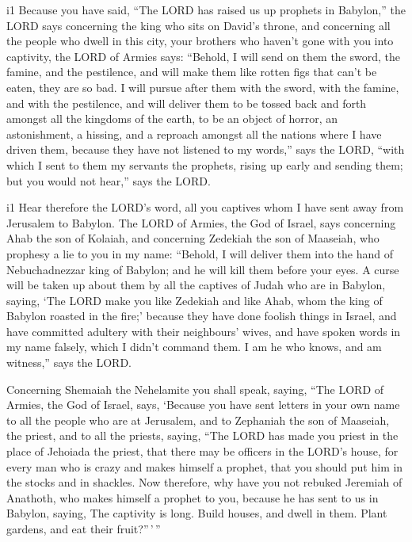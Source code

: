 i1 Because you have said, ``The LORD has raised us up
prophets in Babylon,''  the LORD says concerning the king
who sits on David's throne, and concerning all the people who dwell in
this city, your brothers who haven't gone with you into captivity,
 the LORD of Armies says: ``Behold, I will send on them
the sword, the famine, and the pestilence, and will make them like
rotten figs that can't be eaten, they are so bad.  I will
pursue after them with the sword, with the famine, and with the
pestilence, and will deliver them to be tossed back and forth amongst
all the kingdoms of the earth, to be an object of horror, an
astonishment, a hissing, and a reproach amongst all the nations where I
have driven them,  because they have not listened to my
words,'' says the LORD, ``with which I sent to them my servants the
prophets, rising up early and sending them; but you would not hear,''
says the LORD.

i1 Hear therefore the LORD's word, all you captives whom
I have sent away from Jerusalem to Babylon.  The LORD of
Armies, the God of Israel, says concerning Ahab the son of Kolaiah, and
concerning Zedekiah the son of Maaseiah, who prophesy a lie to you in my
name: ``Behold, I will deliver them into the hand of Nebuchadnezzar king
of Babylon; and he will kill them before your eyes.  A
curse will be taken up about them by all the captives of Judah who are
in Babylon, saying, `The LORD make you like Zedekiah and like Ahab, whom
the king of Babylon roasted in the fire;'  because they
have done foolish things in Israel, and have committed adultery with
their neighbours' wives, and have spoken words in my name falsely, which
I didn't command them. I am he who knows, and am witness,'' says the
LORD.

 Concerning Shemaiah the Nehelamite you shall speak,
saying,  ``The LORD of Armies, the God of Israel, says,
`Because you have sent letters in your own name to all the people who
are at Jerusalem, and to Zephaniah the son of Maaseiah, the priest, and
to all the priests, saying,  ``The LORD has made you
priest in the place of Jehoiada the priest, that there may be officers
in the LORD's house, for every man who is crazy and makes himself a
prophet, that you should put him in the stocks and in shackles.
 Now therefore, why have you not rebuked Jeremiah of
Anathoth, who makes himself a prophet to you,  because he
has sent to us in Babylon, saying, The captivity is long. Build houses,
and dwell in them. Plant gardens, and eat their fruit?''\,'\,''

